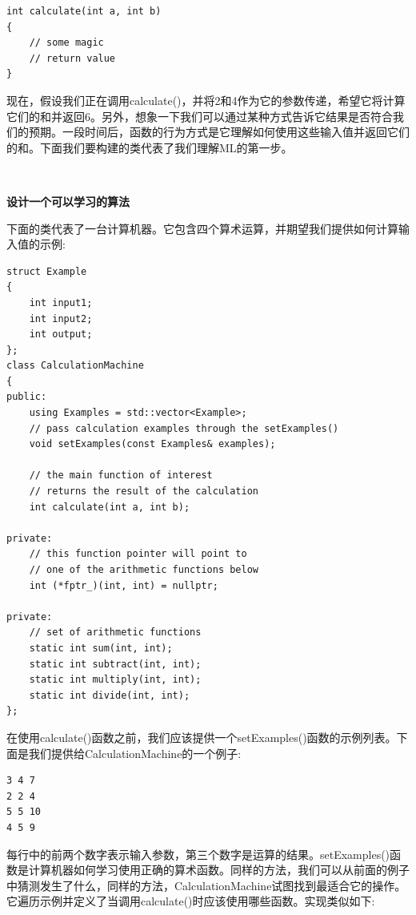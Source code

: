 \begin{lstlisting}[caption={}]
int calculate(int a, int b)
{
	// some magic
	// return value
}
\end{lstlisting}

现在，假设我们正在调用calculate()，并将2和4作为它的参数传递，希望它将计算它们的和并返回6。另外，想象一下我们可以通过某种方式告诉它结果是否符合我们的预期。一段时间后，函数的行为方式是它理解如何使用这些输入值并返回它们的和。下面我们要构建的类代表了我们理解ML的第一步。 \par

\noindent\textbf{}\ \par
\textbf{设计一个可以学习的算法} \ \par
下面的类代表了一台计算机器。它包含四个算术运算，并期望我们提供如何计算输入值的示例: \par

\begin{lstlisting}[caption={}]
struct Example
{
	int input1;
	int input2;
	int output;
};
class CalculationMachine
{
public:
	using Examples = std::vector<Example>;
	// pass calculation examples through the setExamples()
	void setExamples(const Examples& examples);
	
	// the main function of interest
	// returns the result of the calculation
	int calculate(int a, int b);

private:
	// this function pointer will point to
	// one of the arithmetic functions below
	int (*fptr_)(int, int) = nullptr;
	
private:
	// set of arithmetic functions
	static int sum(int, int);
	static int subtract(int, int);
	static int multiply(int, int);
	static int divide(int, int);
};
\end{lstlisting}

在使用calculate()函数之前，我们应该提供一个setExamples()函数的示例列表。下面是我们提供给CalculationMachine的一个例子: \par

\begin{lstlisting}[caption={}]
3 4 7
2 2 4
5 5 10
4 5 9
\end{lstlisting}

每行中的前两个数字表示输入参数，第三个数字是运算的结果。setExamples()函数是计算机器如何学习使用正确的算术函数。同样的方法，我们可以从前面的例子中猜测发生了什么，同样的方法，CalculationMachine试图找到最适合它的操作。它遍历示例并定义了当调用calculate()时应该使用哪些函数。实现类似如下: \par

